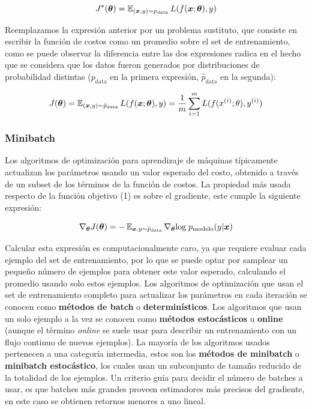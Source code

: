\begin{equation}
J^{*}(\bm{\theta}) = \operatorname{\mathbb{E}}_{(\bm{x},y)\sim {p}_{\textrm{data}}}L(f(\bm{x};\bm{\theta}),y)
\label{gradiente_completo}
\end{equation}

Reemplazamos la expresión anterior por un problema sustituto, que consiste en escribir la funci\'on de costos como un promedio sobre el set de entrenamiento, como se puede observar la diferencia entre las dos expresiones radica en el hecho que se considera que los datos fueron generados por distribuciones de probabilidad distintas (${p}_{\textrm{data}}$ en la primera expresión, $\hat{p}_{\textrm{data}}$ en la segunda):

\begin{equation}
J(\bm{\theta}) = \operatorname{\mathbb{E}}_{(\bm{x},y)\sim \hat{p}_{\textrm{data}}}L(f(\bm{x};\bm{\theta}),y) = \frac{1}{m}\sum_{i=1}^m L(f(x^{(i)};\theta),y^{(i)})
\end{equation}

\subsubsection{Minibatch}

Los algoritmos de optimizaci\'on para aprendizaje de m\'aquinas t\'ipicamente actualizan los par\'ametros usando un valor esperado del costo, obtenido a trav\'es de un subset de los t\'erminos de la funci\'on de costos. La propiedad m\'as usada respecto de la funci\'on objetivo (1) es sobre el gradiente, este cumple la siguiente expresión:

\begin{equation}
\nabla_{\bm{\theta}}J(\bm{\theta}) = -\operatorname{\mathbb{E}}_{\bm{x},y\sim \hat{p}_{\textrm{data}}}\nabla_{\bm{\theta}}\textrm{log}\; p_{\textrm{modelo}}(y|\bm{x})
\end{equation}

Calcular esta expresi\'on es computacionalmente caro, ya que requiere evaluar cada ejemplo del set de entrenamiento, por lo que se puede optar por samplear un peque{\~{n}}o n\'umero de ejemplos para obtener este valor esperado, calculando el promedio usando solo estos ejemplos. Los algoritmos de optimizaci\'on que usan el set de entrenamiento completo para actualizar los par\'ametros en cada iteraci\'on se conocen como \textbf{m\'etodos de batch} o \textbf{determin\'isticos}. Los algoritmos que usan un solo ejemplo a la vez se conocen como \textbf{m\'etodos estoc\'asticos} u \textbf{online} (aunque el t\'ermino \textit{online} se suele usar para describir un entrenamiento con un flujo continuo de nuevos ejemplos). La mayor\'ia de los algoritmos usados pertenecen a una categor\'ia intermedia, estos son los \textbf{m\'etodos de minibatch} o \textbf{minibatch estoc\'astico}, los cuales usan un subconjunto de tamaño reducido de la totalidad de los ejemplos. Un criterio gu\'ia para decidir el n\'umero de batches a usar, es que batches m\'as grandes proveen estimadores m\'as precisos del gradiente, en este caso se obtienen retornos menores a uno lineal.

